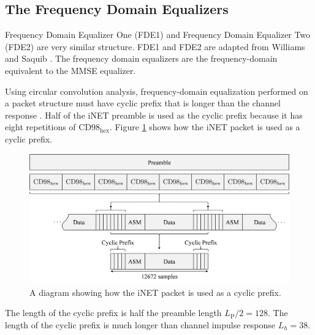 \clearpage
\subsection{The Frequency Domain Equalizers}
\label{sec:FDE}
Frequency Domain Equalizer One (FDE1) and Frequency Domain Equalizer Two (FDE2) are very similar structure.
FDE1 and FDE2 are adapted from Williams and Saquib \cite[eq. (11) and (12)]{williams2013linear} \cite{coon2006channel}.
The frequency domain equalizers are the frequency-domain equivalent to the MMSE equalizer. 

Using circular convolution analysis, frequency-domain equalization performed on a packet structure must have cyclic prefix that is longer than the channel response \cite{sari1994frequency,ng2007turbo,al2008single,proakis-salehi:2008}.
Half of the iNET preamble is used as the cyclic prefix because it has eight repetitions of $\text{CD98}_\text{hex}$.
Figure \ref{fig:cyclicPrefix} shows how the iNET packet is used as a cyclic prefix.
\begin{figure}
	\centering\includegraphics[width=9.47in/100*55]{figures/eq_equations/cyclicPrefix.pdf}
	\caption{A diagram showing how the iNET packet is used as a cyclic prefix.}
	\label{fig:cyclicPrefix}
\end{figure}
The length of the cyclic prefix is half the preamble length $L_\text{P}/2 = 128$.
The length of the cyclic prefix is much longer than channel impulse response $L_h = 38$.



